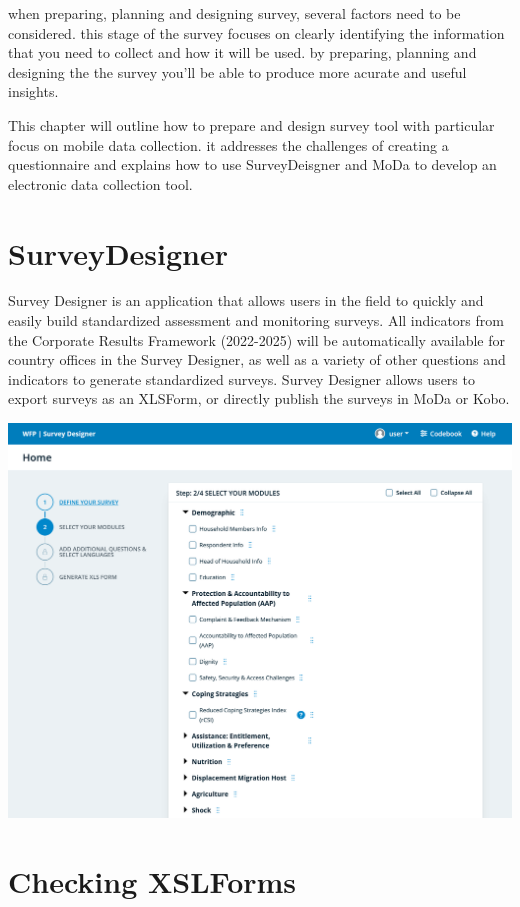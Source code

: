 \documentclass[
  letterpaper,
  DIV=11,
  numbers=noendperiod]{scrreprt}
\begin{document}
when preparing, planning and designing survey, several factors need to
be considered. this stage of the survey focuses on clearly identifying
the information that you need to collect and how it will be used. by
preparing, planning and designing the the survey you'll be able to
produce more acurate and useful insights.

This chapter will outline how to prepare and design survey tool with
particular focus on mobile data collection. it addresses the challenges
of creating a questionnaire and explains how to use SurveyDeisgner and
MoDa to develop an electronic data collection tool.

\section{SurveyDesigner}\label{surveydesigner}

Survey Designer is an application that allows users in the field to
quickly and easily build standardized assessment and monitoring surveys.
All indicators from the Corporate Results Framework (2022-2025) will be
automatically available for country offices in the Survey Designer, as
well as a variety of other questions and indicators to generate
standardized surveys. Survey Designer allows users to export surveys as
an XLSForm, or directly publish the surveys in MoDa or Kobo.

\includegraphics[width=1\linewidth,height=\textheight,keepaspectratio]{assets/SurveyDesigner.png}

\section{Checking XSLForms}\label{checking-xslforms}
\end{document}
